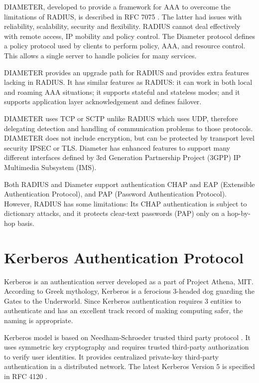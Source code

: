 \begin{multicols}{2}
DIAMETER, developed to provide a framework for AAA to overcome the limitations of RADIUS, is described in RFC 7075 \cite{chap2-key24}. The latter had issues with reliability, scalability, security and flexibility. RADIUS cannot deal effectively with remote access, IP mobility and policy control. The Diameter protocol defines a policy protocol used by clients to perform policy, AAA, and resource control. This allows a single server to handle policies for many services.

DIAMETER provides an upgrade path for RADIUS and provides extra features lacking in RADIUS. It has similar features as RADIUS: it can work in both local and roaming AAA situations; it supports stateful and stateless modes; and it supports application layer acknowledgement and defines failover.

DIAMETER uses TCP or SCTP unlike RADIUS which uses UDP, therefore delegating detection and handling of communication problems to those protocols. DIAMETER does not include encryption, but can be protected by transport level security IPSEC or TLS. Diameter has enhanced features to support many different interfaces defined by 3rd Generation Partnership Project (3GPP) IP Multimedia Subsystem (IMS).

Both RADIUS and Diameter support authentication CHAP and EAP (Extensible Authentication Protocol), and PAP (Password Authentication Protocol). However, RADIUS has some limitations: Its CHAP authentication is subject to dictionary attacks, and it protects clear-text passwords (PAP) only on a hop-by-hop basis. 

\section*{Kerberos Authentication Protocol}

Kerberos is an authentication server developed as a part of Project Athena, MIT. According to Greek mythology, Kerberos is a ferocious 3-headed dog guarding the Gates to the Underworld. Since Kerberos authentication requires 3 entities to authenticate and has an excellent track record of making computing safer, the naming is appropriate. 

Kerberos model is based on Needham-Schroeder trusted third party protocol \cite{chap2-key1}. It uses symmetric key cryptography and requires trusted third-party authorization to verify user identities. It provides centralized private-key third-party authentication in a distributed network. The latest Kerberos Version 5 is specified in RFC 4120 \cite{chap2-key12}.


\end{multicols}
